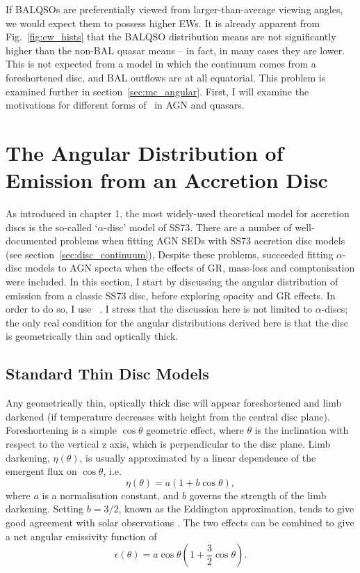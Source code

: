 If BALQSOs are preferentially viewed from larger-than-average viewing angles,
we would expect them to possess higher EWs. 
It is already apparent from Fig.~\ref{fig:ew_hists} that the BALQSO distribution means 
are not significantly higher than the non-BAL quasar
means -- in fact, in many cases they are lower. 
This is not expected from a model
in which the continuum comes from a foreshortened disc, and BAL outflows are at all equatorial.
This problem is examined further in section~\ref{sec:mc_angular}. 
First, I will examine the motivations for different forms of \ept\ 
in AGN and quasars.

\section{The Angular Distribution of Emission from an Accretion Disc}
\label{sec:disc_agn}

\noindent 
As introduced in chapter 1, the most widely-used theoretical model for accretion discs
is the so-called `$\alpha$-disc' model of SS73. 
There are a number of well-documented problems when fitting 
AGN SEDs with SS73 accretion disc models (see section~\ref{sec:disc_continuum}), 
Despite these problems, \cite{capellupo2015} succeeded
fitting $\alpha$-disc models to AGN specta when the effects of
GR, mass-loss and comptonisation were included.
In this section, I start by discussing the angular distribution of
emission from a classic SS73 disc, before exploring opacity and GR 
effects. In order to do so, I use \agn\
\citep{hubeny2000,davishubeny2006,davis2007}. I stress that the 
discussion here is not limited to $\alpha$-discs; the only real condition
for the angular distributions derived here is that the 
disc is geometrically thin and optically thick.

\subsection{Standard Thin Disc Models}

\noindent
Any geometrically thin, optically thick disc will appear
foreshortened and limb darkened (if temperature decreases
with height from the central disc plane). 
Foreshortening is a simple $\cos \theta$ geometric effect, 
where $\theta$ is the inclination with respect to the vertical z axis, which
is perpendicular to the disc plane.
Limb darkening, $\eta(\theta)$, is usually approximated by a linear dependence
of the emergent flux on $\cos \theta$, i.e. 
\begin{equation}
\eta(\theta) = a \left( 1 + b \cos \theta \right),
\end{equation}
where $a$ is a normalisation constant, and $b$ governs the strength
of the limb darkening. Setting $b=3/2$, known as the Eddington approximation,
tends to give good agreement with solar observations 
\citep[e.g.][]{mihalas}. The two effects can be 
combined to give a net angular emissivity function of
\begin{equation}
\epsilon(\theta) = a \cos \theta \left( 1 + \frac{3}{2} \cos \theta \right).
\end{equation}

